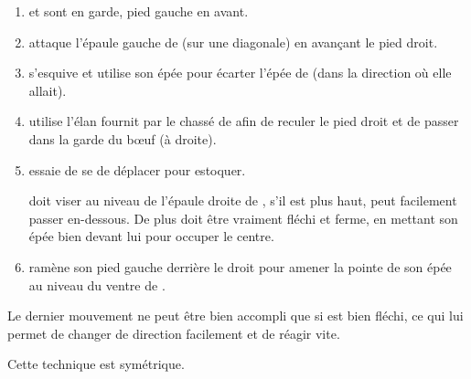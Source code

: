 \begin{technique}
\begin{enumerate}
	\item \A et \D sont en garde, pied gauche en avant.
	
	\item \A attaque l'épaule gauche de \D (sur une diagonale) en avançant le pied droit.
	
	\item \D s'esquive et utilise son épée pour écarter l'épée de \A (dans la direction où elle allait).
	
	\item \A utilise l'élan fournit par le chassé de \D afin de reculer le pied droit et de passer dans la garde du bœuf (à droite).
	
	\item \D essaie de se de déplacer pour estoquer.
	
	\A doit viser au niveau de l'épaule droite de \D, s'il est plus haut, \D peut facilement passer en-dessous. De plus \A doit être vraiment fléchi et ferme, en mettant son épée bien devant lui pour occuper le centre.
	
	\item \A ramène son pied gauche derrière le droit pour amener la pointe de son épée au niveau du ventre de \D.
\end{enumerate}

Le dernier mouvement ne peut être bien accompli que si \A est bien fléchi, ce qui lui permet de changer de direction facilement et de réagir vite.

Cette technique est symétrique.

\end{technique}

